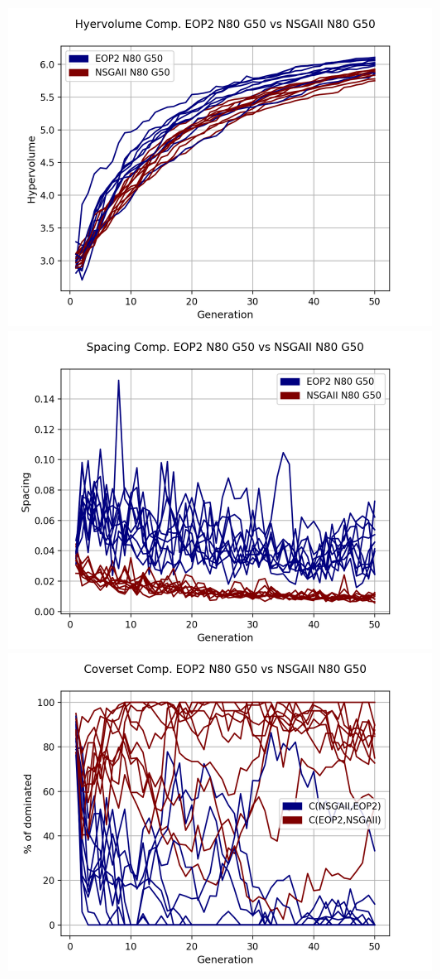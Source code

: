 \begin{figure}[H]
\includegraphics[scale=0.35]{../METRICS_PLOTS/Hypervol_COMP_EOP2N80G50_NSGAIIN80G50.png}
\includegraphics[scale=0.35]{../METRICS_PLOTS/Spacing_COMP_EOP2N80G50_NSGAIIN80G50.png}
\includegraphics[scale=0.35]{../METRICS_PLOTS/CoverSet_COMP_EOP2N80G50_NSGAIIN80G50.png}\\

\end{figure}
